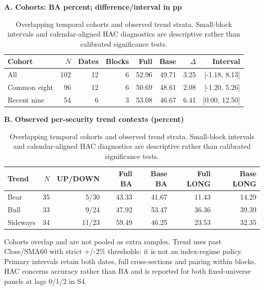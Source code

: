 \begin{table}[!htbp]
\centering\small
\setlength{\tabcolsep}{3pt}
\renewcommand{\arraystretch}{1.15}
\caption{Overlapping temporal cohorts and observed trend strata. Small-block intervals and calendar-aligned HAC diagnostics are descriptive rather than calibrated significance tests.}
\label{tab:temporal}
\textbf{A. Cohorts: BA percent; difference/interval in pp}\par\smallskip
\begin{tabular}{lrrrrrrr}
\hline
Cohort & $N$ & Dates & Blocks & Full & Base & $\Delta$ & Interval \\
\hline
All & 102 & 12 & 6 & 52.96 & 49.71 & 3.25 & [-1.18, 8.13] \\
Common eight & 96 & 12 & 6 & 50.69 & 48.61 & 2.08 & [-1.20, 5.26] \\
Recent nine & 54 & 6 & 3 & 53.08 & 46.67 & 6.41 & [0.00, 12.50] \\
\hline
\end{tabular}\par\medskip
\textbf{B. Observed per-security trend contexts (percent)}\par\smallskip
\begin{tabular}{lrrrrrr}
\hline
Trend & $N$ & UP/DOWN & Full BA & Base BA & Full LONG & Base LONG \\
\hline
Bear & 35 & 5/30 & 43.33 & 41.67 & 11.43 & 14.29 \\
Bull & 33 & 9/24 & 47.92 & 53.47 & 36.36 & 39.39 \\
Sideways & 34 & 11/23 & 59.49 & 46.25 & 23.53 & 32.35 \\
\hline
\end{tabular}\par\medskip
\begin{minipage}{\textwidth}\footnotesize Cohorts overlap and are not pooled as extra samples. Trend uses past Close/SMA60 with strict +/-2\% thresholds; it is not an index-regime policy. Primary intervals retain both dates, full cross-sections and pairing within blocks. HAC concerns accuracy rather than BA and is reported for both fixed-universe panels at lags 0/1/2 in S4.\end{minipage}
\end{table}
